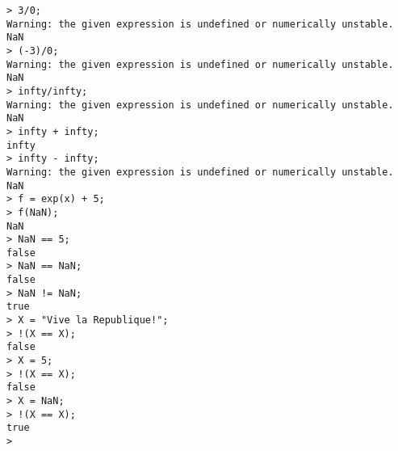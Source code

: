 \begin{center}\begin{minipage}{15cm}\begin{Verbatim}[frame=single]
> 3/0;
Warning: the given expression is undefined or numerically unstable.
NaN
> (-3)/0;
Warning: the given expression is undefined or numerically unstable.
NaN
> infty/infty;
Warning: the given expression is undefined or numerically unstable.
NaN
> infty + infty;
infty
> infty - infty;
Warning: the given expression is undefined or numerically unstable.
NaN
> f = exp(x) + 5;
> f(NaN);
NaN
> NaN == 5;
false
> NaN == NaN;
false
> NaN != NaN;
true
> X = "Vive la Republique!";
> !(X == X);
false
> X = 5;
> !(X == X);
false
> X = NaN;
> !(X == X);
true
> 
\end{Verbatim}
\end{minipage}\end{center}
